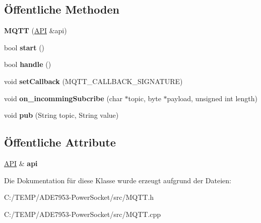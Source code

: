 \subsection*{Öffentliche Methoden}
\begin{DoxyCompactItemize}
\item 
\mbox{\label{class_m_q_t_t_a5908a8a2507409f065e9d68c4f086f91}} 
{\bfseries M\+Q\+TT} (\hyperlink{class_a_p_i}{A\+PI} \&api)
\item 
\mbox{\label{class_m_q_t_t_ae15d841989b9faa5b93a2682b8b92bbb}} 
bool {\bfseries start} ()
\item 
\mbox{\label{class_m_q_t_t_a14be943e1a3441660f2a6c86ffeed6a4}} 
bool {\bfseries handle} ()
\item 
\mbox{\label{class_m_q_t_t_aa518d3877c2a6cd83e5e4ade22b9226f}} 
void {\bfseries set\+Callback} (M\+Q\+T\+T\+\_\+\+C\+A\+L\+L\+B\+A\+C\+K\+\_\+\+S\+I\+G\+N\+A\+T\+U\+RE)
\item 
\mbox{\label{class_m_q_t_t_a1b777cfb8d300947e1f5b35c0d18cf47}} 
void {\bfseries on\+\_\+incomming\+Subcribe} (char $\ast$topic, byte $\ast$payload, unsigned int length)
\item 
\mbox{\label{class_m_q_t_t_af0666c91c7c9b6ed6504107f5197c4f3}} 
void {\bfseries pub} (String topic, String value)
\end{DoxyCompactItemize}
\subsection*{Öffentliche Attribute}
\begin{DoxyCompactItemize}
\item 
\mbox{\label{class_m_q_t_t_a2ca668403e3068d75e85749151904a5e}} 
\hyperlink{class_a_p_i}{A\+PI} \& {\bfseries api}
\end{DoxyCompactItemize}


Die Dokumentation für diese Klasse wurde erzeugt aufgrund der Dateien\+:\begin{DoxyCompactItemize}
\item 
C\+:/\+T\+E\+M\+P/\+A\+D\+E7953-\/\+Power\+Socket/src/M\+Q\+T\+T.\+h\item 
C\+:/\+T\+E\+M\+P/\+A\+D\+E7953-\/\+Power\+Socket/src/M\+Q\+T\+T.\+cpp\end{DoxyCompactItemize}
